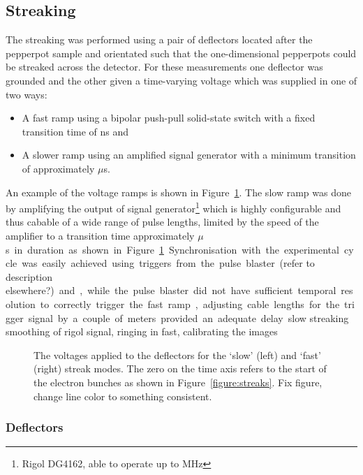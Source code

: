 \subsection{Streaking}
The streaking was performed using a pair of deflectors located after the pepperpot sample and orientated such that the one-dimensional pepperpots could be streaked across the detector.
For these measurements one deflector was grounded and the other given a time-varying voltage which was supplied in one of two ways:
\begin{itemize}
\item A fast ramp using a bipolar push-pull solid-state switch with a fixed transition time of \unit[10]{ns} and
\item A slower ramp using an amplified signal generator with a minimum transition of approximately \unit[10]{$\mu$s}.
\end{itemize}
An example of the voltage ramps is shown in Figure~\ref{figure:deflector_voltages}. The slow ramp was done by amplifying the output of signal generator\footnote{Rigol DG4162, able to operate up to \unit[160]{MHz}} which is highly configurable and thus cabable of a wide range of pulse lengths, limited by the speed of the amplifier to a transition time approximately \unit[10]{$\mu$s} in duration as shown in Figure~\ref{figure:deflector_voltages}.

Synchronisation with the experimental cycle was easily achieved using triggers from the pulse blaster {\color{red}(refer to description elsewhere?)} and, while the pulse blaster did not have sufficient temporal resolution to correctly trigger the fast ramp, adjusting cable lengths for the trigger signal by a couple of meters provided an adequate delay.

{\color{red}slow streaking smoothing of rigol signal, ringing in fast, calibrating the images}
\begin{figure}\label{figure:deflector_voltages}
    \center
    
    \caption{The voltages applied to the deflectors for the `slow' (left) and `fast' (right) streak modes. The zero on the time axis refers to the start of the electron bunches as shown in Figure~\ref{figure:streaks}. {\color{red} Fix figure, change line color to something consistent.}}
    \label{figure:deflector_voltages}
\end{figure}

\subsubsection{Deflectors}

